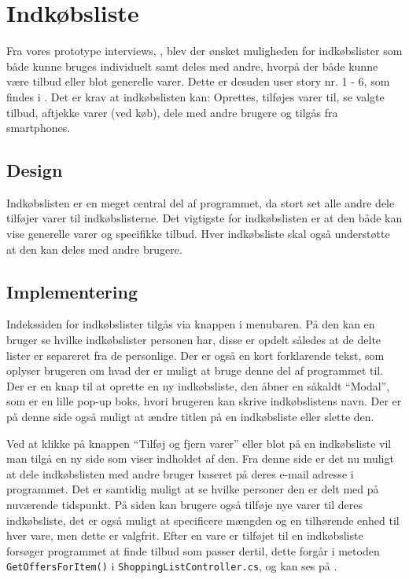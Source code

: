 \section{Indkøbsliste} 
Fra vores prototype interviews, , blev der ønsket muligheden for indkøbslister som både kunne bruges individuelt samt deles med andre, hvorpå der både kunne være tilbud eller blot generelle varer. 
Dette er desuden user story nr. 1 - 6, som findes i . 
Det er krav at indkøbslisten kan: Oprettes, tilføjes varer til, se valgte tilbud, aftjekke varer (ved køb), dele med andre brugere og tilgås fra smartphones.

\subsection{Design}

Indkøbslisten er en meget central del af programmet, da stort set alle andre dele tilføjer varer til indkøbslisterne.
Det vigtigste for indkøbslisten er at den både kan vise generelle varer og specifikke tilbud. 
Hver indkøbsliste skal også understøtte at den kan deles med andre brugere. 
\subsection{Implementering}

Indekssiden for indkøbslister tilgås via knappen i menubaren.
På den kan en bruger se hvilke indkøbslister personen har, disse er opdelt således at de delte lister er separeret fra de personlige.
Der er også en kort forklarende tekst, som oplyser brugeren om hvad der er muligt at bruge denne del af programmet til.
Der er en knap til at oprette en ny indkøbsliste, den åbner en såkaldt ``Modal'', som er en lille pop-up boks, hvori brugeren kan skrive indkøbslistens navn. 
Der er på denne side også muligt at ændre titlen på en indkøbsliste eller slette den.

Ved at klikke på knappen ``Tilføj og fjern varer'' eller blot på en indkøbsliste vil man tilgå en ny side som viser indholdet af den.
Fra denne side er det nu muligt at dele indkøbslisten med andre bruger baseret på deres e-mail adresse i programmet.
Det er samtidig muligt at se hvilke personer den er delt med på nuværende tidspunkt.
På siden kan brugere også tilføje nye varer til deres indkøbsliste, det er også muligt at specificere mængden og en tilhørende enhed til hver vare, men dette er valgfrit.
Efter en vare er tilføjet til en indkøbsliste forsøger programmet at finde tilbud som passer dertil, dette forgår i metoden \texttt{GetOffersForItem()} i \texttt{ShoppingListController.cs}, og kan ses på .

